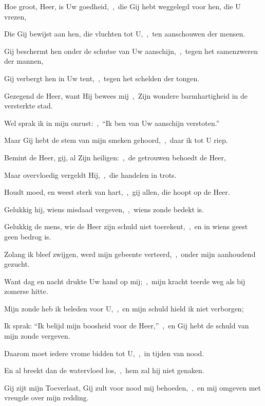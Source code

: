 \documentclass[12pt,twoside,a5paper]{article}
\begin{document}
\begin{halfparskip}
  Hoe groot, Heer, is Uw goedheid,~\sep\ die Gij hebt weggelegd voor hen, die U vrezen,

  Die Gij bewijst aan hen, die vluchten tot U,~\sep\ ten aanschouwen der mensen.

  Gij beschermt hen onder de schutse van Uw aanschijn,~\sep\ tegen het samenzweren der mannen,

  Gij verbergt hen in Uw tent,~\sep\ tegen het schelden der tongen.

  Gezegend de Heer, want Hij bewees mij~\sep\ Zijn wondere barmhartigheid in de versterkte stad.

  Wel sprak ik in mijn onrust:~\sep\ ``Ik ben van Uw aanschijn verstoten.''

  Maar Gij hebt de stem van mijn smeken gehoord,~\sep\ daar ik tot U riep.

  Bemint de Heer, gij, al Zijn heiligen:~\sep\ de getrouwen behoedt de Heer,

  Maar overvloedig vergeldt Hij,~\sep\ die handelen in trots.

  Houdt moed, en weest sterk van hart,~\sep\ gij allen, die hoopt op de Heer.
\end{halfparskip}



\begin{halfparskip}
  Gelukkig hij, wiens misdaad vergeven,~\sep\ wiens zonde bedekt is.


  Gelukkig de mens, wie de Heer zijn schuld niet toerekent,~\sep\ en in wiens geest geen bedrog is.
\end{halfparskip}


\begin{halfparskip}
  Zolang ik bleef zwijgen, werd mijn gebeente verteerd,~\sep\ onder mijn aanhoudend gezucht.

  Want dag en nacht drukte Uw hand op mij;~\sep\ mijn kracht teerde weg als bij zomerse hitte.

  Mijn zonde heb ik beleden voor U,~\sep\ en mijn schuld hield ik niet verborgen;

  Ik sprak: ``Ik belijd mijn boosheid voor de Heer,''~\sep\ en Gij hebt de schuld van mijn zonde vergeven.

  Daarom moet iedere vrome bidden tot U,~\sep\ in tijden van nood.

  En al breekt dan de watervloed los,~\sep\ hem zal hij niet genaken.

  Gij zijt mijn Toeverlaat, Gij zult voor nood mij behoeden,~\sep\ en mij omgeven met vreugde over mijn redding.
\end{halfparskip}
\end{document}

